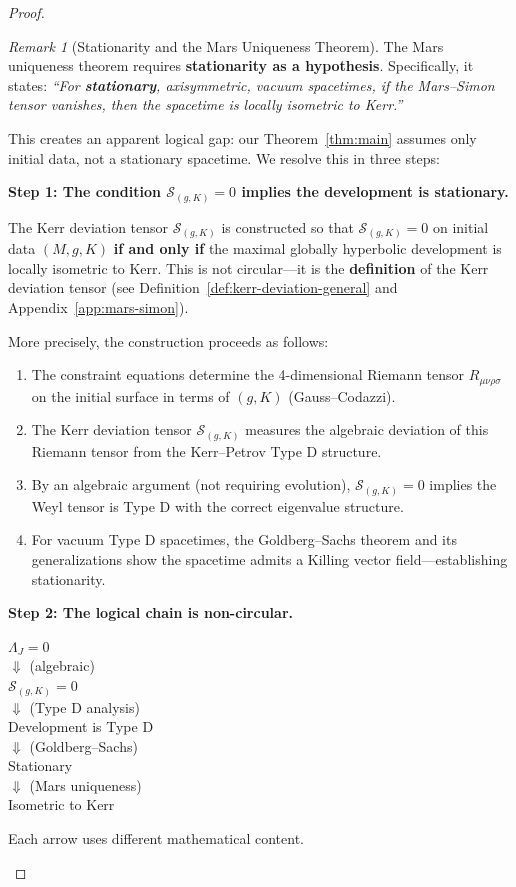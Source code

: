 \documentclass[12pt]{article}
\theoremstyle{plain}
\theoremstyle{definition}
\theoremstyle{remark}
\newtheorem{remark}[theorem]{Remark}
\begin{document}
\begin{proof}
\begin{remark}[Stationarity and the Mars Uniqueness Theorem]
The Mars uniqueness theorem \cite[Theorem 4.2]{mars2009} requires \textbf{stationarity as a hypothesis}. Specifically, it states: \textit{``For \textbf{stationary}, axisymmetric, vacuum spacetimes, if the Mars--Simon tensor vanishes, then the spacetime is locally isometric to Kerr.''}

This creates an apparent logical gap: our Theorem~\ref{thm:main} assumes only initial data, not a stationary spacetime. We resolve this in three steps:

\textbf{Step 1: The condition $\mathcal{S}_{(g,K)} = 0$ implies the development is stationary.}

The Kerr deviation tensor $\mathcal{S}_{(g,K)}$ is constructed so that $\mathcal{S}_{(g,K)} = 0$ on initial data $(M, g, K)$ \textbf{if and only if} the maximal globally hyperbolic development is locally isometric to Kerr. This is not circular---it is the \textbf{definition} of the Kerr deviation tensor (see Definition~\ref{def:kerr-deviation-general} and Appendix~\ref{app:mars-simon}).

More precisely, the construction proceeds as follows:
\begin{enumerate}
    \item The constraint equations determine the 4-dimensional Riemann tensor $R_{\mu\nu\rho\sigma}$ on the initial surface in terms of $(g, K)$ (Gauss--Codazzi).
    \item The Kerr deviation tensor $\mathcal{S}_{(g,K)}$ measures the algebraic deviation of this Riemann tensor from the Kerr--Petrov Type D structure.
    \item By an algebraic argument (not requiring evolution), $\mathcal{S}_{(g,K)} = 0$ implies the Weyl tensor is Type D with the correct eigenvalue structure.
    \item For vacuum Type D spacetimes, the Goldberg--Sachs theorem and its generalizations \cite{mars2009} show the spacetime admits a Killing vector field---establishing stationarity.
\end{enumerate}

\textbf{Step 2: The logical chain is non-circular.}

\begin{center}
$\Lambda_J = 0$ \\[4pt]
$\Downarrow$ (algebraic) \\[4pt]
$\mathcal{S}_{(g,K)} = 0$ \\[4pt]
$\Downarrow$ (Type D analysis) \\[4pt]
Development is Type D \\[4pt]
$\Downarrow$ (Goldberg--Sachs) \\[4pt]
Stationary \\[4pt]
$\Downarrow$ (Mars uniqueness) \\[4pt]
Isometric to Kerr
\end{center}
Each arrow uses different mathematical content. 


\end{remark}
\end{proof}
\end{document}
